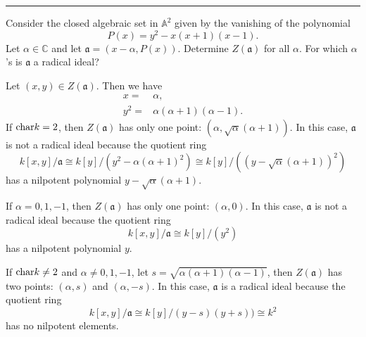 \documentclass[letterpaper, 12pt]{article}
\begin{document}
\noindent\rule{7in}{2.8pt}
\begin{problem}{1.6}
Consider the closed algebraic set in \(\mathbb{A}^2\) given by the vanishing of the polynomial 
\[P(x)=y^2-x(x+1)(x-1).\]
Let \(\alpha\in \mathbb{C}\) and let \(\mathfrak{a}=(x-\alpha,P(x))\). Determine \(Z(\mathfrak{a})\) for all \(\alpha\). For which \(\alpha\)'s is \(\mathfrak{a}\) a radical ideal?
\end{problem}
\begin{solution}
Let \((x,y)\in Z(\mathfrak{a})\). Then we have 
\begin{align*}
     x=&\alpha,\\
     y^2=&\alpha(\alpha+1)(\alpha-1).
\end{align*}
If \(\text{char} k=2\), then \(Z(\mathfrak{a})\) has only one point: \((\alpha,\sqrt{\alpha}(\alpha+1))\). In this case, \(\mathfrak{a}\) is not a radical ideal because the quotient ring 
\[k[x,y]/\mathfrak{a}\cong k[y]/(y^2-\alpha(\alpha+1)^2)\cong k[y]/((y-\sqrt{\alpha}(\alpha+1))^2)\]
has a nilpotent polynomial \(y-\sqrt{\alpha}(\alpha+1)\). 

If \(\alpha=0,1,-1\), then \(Z(\mathfrak{a})\) has only one point: \((\alpha,0)\). In this case, \(\mathfrak{a}\) is not a radical ideal because the quotient ring 
\[k[x,y]/\mathfrak{a}\cong k[y]/(y^2)\]
has a nilpotent polynomial \(y\).

If \(\text{char} k\neq 2\) and \(\alpha\neq 0,1,-1\), let \(s=\sqrt{\alpha(\alpha+1)(\alpha-1)}\), then \(Z(\mathfrak{a})\) has two points: \((\alpha,s)\) and \((\alpha,-s)\). In this case, \(\mathfrak{a}\) is a radical ideal because the quotient ring 
\[k[x,y]/\mathfrak{a}\cong k[y]/(y-s)(y+s))\cong k^2\]
has no nilpotent elements.
\end{solution}
\end{document}
